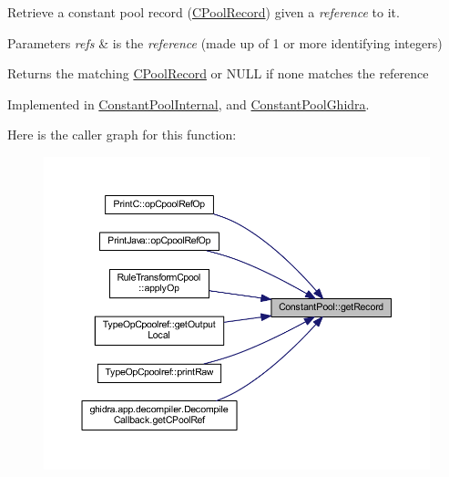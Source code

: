 Retrieve a constant pool record (\mbox{\hyperlink{class_c_pool_record}{C\+Pool\+Record}}) given a {\itshape reference} to it. 


\begin{DoxyParams}{Parameters}
{\em refs} & is the {\itshape reference} (made up of 1 or more identifying integers) \\
\hline
\end{DoxyParams}
\begin{DoxyReturn}{Returns}
the matching \mbox{\hyperlink{class_c_pool_record}{C\+Pool\+Record}} or N\+U\+LL if none matches the reference 
\end{DoxyReturn}


Implemented in \mbox{\hyperlink{class_constant_pool_internal_a28cbe88a2aa77b21bbf7a8027485ad37}{Constant\+Pool\+Internal}}, and \mbox{\hyperlink{class_constant_pool_ghidra_ac4520027014d9d9c6cd6e12b17488f02}{Constant\+Pool\+Ghidra}}.

Here is the caller graph for this function\+:
\nopagebreak
\begin{figure}[H]
\begin{center}
\leavevmode
\includegraphics[width=350pt]{class_constant_pool_ac17df35ff1376311f62912d29bf26cad_icgraph}
\end{center}
\end{figure}
\mbox{\label{class_constant_pool_a004b94bca379a22b84d11b7299eabdd8}} 

